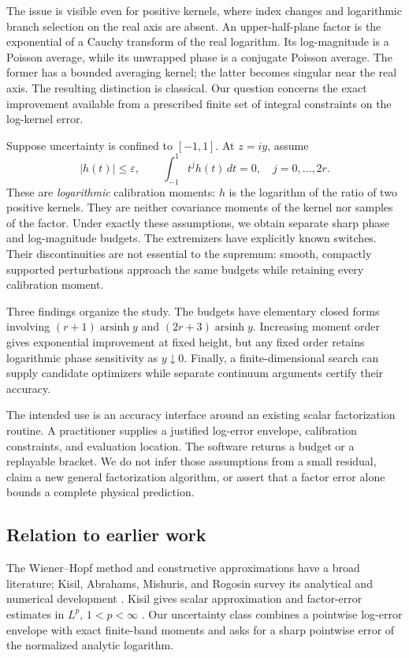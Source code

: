 \documentclass[11pt]{article}
\theoremstyle{remark}\newtheorem{remark}[theorem]{Remark}
\newcommand{\eps}{\varepsilon}
\newcommand{\asinh}{\operatorname{arsinh}}
\begin{document}
The issue is visible even for positive kernels, where index changes and
logarithmic branch selection on the real axis are absent. An upper-half-plane
factor is the exponential of a Cauchy transform of the real logarithm. Its
log-magnitude is a Poisson average, while its unwrapped phase is a conjugate
Poisson average. The former has a bounded averaging kernel; the latter becomes
singular near the real axis. The resulting distinction is classical.
Our question concerns the exact improvement available from a prescribed finite
set of integral constraints on the log-kernel error.

Suppose uncertainty is confined to $[-1,1]$. At $z=iy$, assume
\[
 |h(t)|\leq\eps,\qquad
 \int_{-1}^{1}t^jh(t)\,dt=0,\quad j=0,\ldots,2r.
\]
These are \emph{logarithmic} calibration moments: $h$ is the logarithm of the
ratio of two positive kernels. They are neither covariance moments of the kernel
nor samples of the factor. Under exactly these assumptions, we obtain separate
sharp phase and log-magnitude budgets. The extremizers have explicitly known
switches. Their discontinuities are not essential to the supremum: smooth,
compactly supported perturbations approach the same budgets while retaining
every calibration moment.

Three findings organize the study. The budgets have elementary closed forms
involving $(r+1)\asinh y$ and $(2r+3)\asinh y$. Increasing moment order gives
exponential improvement at fixed height, but any fixed order retains
logarithmic phase sensitivity as $y\downarrow0$. Finally, a finite-dimensional
search can supply candidate optimizers while separate continuum arguments
certify their accuracy.

The intended use is an accuracy interface around an existing scalar
factorization routine. A practitioner supplies a justified log-error envelope,
calibration constraints, and evaluation location. The software returns a budget
or a replayable bracket. We do not infer those assumptions from a small residual,
claim a new general factorization algorithm, or assert that a factor error alone
bounds a complete physical prediction.

\subsection{Relation to earlier work}
The Wiener--Hopf method and constructive approximations have a broad literature;
Kisil, Abrahams, Mishuris, and Rogosin survey its analytical and numerical
development \cite{review}. Kisil gives scalar approximation and factor-error
estimates in $L^p$, $1<p<\infty$ \cite{kisil}. Our uncertainty class combines
a pointwise log-error envelope with exact finite-band moments and asks for a
sharp pointwise error of the normalized analytic logarithm.
\end{document}
